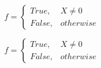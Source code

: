 \documentclass[a4paper]{article}
\begin{document}
\begin{equation}   f =
\begin{cases} True, & X \neq 0\\
False, & otherwise
\end{cases}
\end{equation}

\begin{equation}   f =
\begin{cases} True, & X \neq 0\\
False, & otherwise
\end{cases}
\end{equation}
\end{document}
